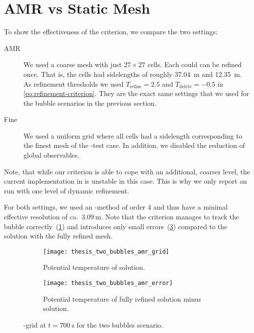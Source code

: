 \section{AMR vs Static Mesh}\label{sec:results-tts-amr}
To show the effectiveness of the \amr{} criterion, we compare the two settings:
\begin{description}
\item[AMR] We used a coarse mesh with just $27 \times 27$ cells.
  Each could can be refined once.
  That is, the cells had sidelengths of roughly \SI{37.04}{\m} and  \SI{12.35}{\m}.
  As refinement thresholds we used $T_\text{refine} = 2.5$ and $T_\text{delete} = -0.5$ in \cref{eq:refinement-criterion}.
  They are the exact same settings that we used for the bubble scenarios in the previous section.
\item[Fine] We used a uniform grid where all cells had a sidelength corresponding to the finest mesh of the \amr{}-test case.
  In addition, we disabled the reduction of global observables.
\end{description}
Note, that while our \amr{} criterion is able to cope with an additional, coarser level, the current implementation in \exahype{} is unstable in this case.
This is why we only report an \amr{} run with one level of dynamic refinement.

For both settings, we used an \aderdg{}-method of order $4$ and thus have a minimal effective resolution of ca.\ $\SI{3.09}{\m}$.
Note that the \amr{} criterion manages to track the bubble correctly~(\cref{fig:two-bubbles-amr-grid}) and introduces only small errors~(\cref{fig:two-bubbles-amr-error}) compared to the solution with the fully refined mesh.

\begin{figure}[htb]
\centering
\begin{subfigure}[t]{0.45\textwidth}
    \centering
    \texttt{[image: thesis\_two\_bubbles\_amr\_grid]} 
    \caption{\label{fig:two-bubbles-amr-grid}%
      Potential temperature of \amr{} solution.}
\end{subfigure}\qquad%
\begin{subfigure}[t]{0.45\textwidth}
    \centering
    \texttt{[image: thesis\_two\_bubbles\_amr\_error]} 
    \caption{\label{fig:two-bubbles-amr-error}%
      Potential temperature of fully refined solution minus \amr{} solution.}
\end{subfigure}

  \caption{%
    \amr{}-grid at $t = \SI{700}{\s}$ for the two bubbles scenario.}
\end{figure}

